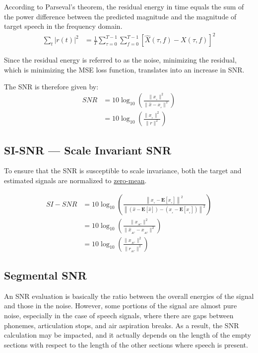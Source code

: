 According to Parseval's theorem, the residual energy in time equals the sum of
the power difference between the predicted magnitude 
and the magnitude of target speech 
in the frequency domain\cite{1643671009}.
\begin{align}
    \sum_{t} |r(t)|^{2} & = \frac{1}{T}\sum_{\tau=0}^{T-1}\sum_{f=0}^{T-1} \left[ \widehat{X}(\tau, f) - X(\tau, f)\right]^{2}
\end{align}

Since the residual energy is referred to as the noise,
minimizing the residual,
which is minimizing the MSE loss function,
translates into an increase in SNR.



The SNR is therefore given by:
\begin{align}\label{eq:snr_equation}
    SNR & = 10\log_{10} \left( \frac{ \| x_{_{s}}\|^{2}}{\|\widehat{x} - x_{_{s}} \|^{2}}  \right) \nonumber \\
    & =  10\log_{10} \left( \frac{ \| x_{_{s}} \|^{2}}{\| r \|^{2}} \right)
\end{align}
\subsection{SI-SNR --- Scale Invariant SNR}
To ensure that the SNR is susceptible to scale invariance\cite{roux2018sdr},
both the target and estimated signals are normalized to \underline{zero-mean}.

\begin{align}
    SI-SNR & = 10\log_{10} \left( \frac{\left\| x_{_{s}} - \mathbf{E}[x_{_{s}}]\right\|^{2}}
    {\left\| (\widehat{x} - \mathbf{E}[\widehat{x}]) - (x_{_{s}} - \mathbf{E}[x_{_{s}}]) \right\|^{2}} \right) \nonumber \\
    & = 10\log_{10} \left( \frac{ \| x_{_{AC}}\|^{2}}{\|\widehat{x}_{_{AC}} - x_{_{AC}}\|^{2}}  \right) \nonumber \\
    & =  10\log_{10} \left( \frac{ \| x_{_{AC}}\|^{2}}{\| r_{_{AC}} \|^{2}} \right)
\end{align}

\subsection{Segmental SNR}
An SNR evaluation is basically the ratio between the overall 
energies of the signal and those in the noise. 
However, some portions of the signal are almost pure noise, 
especially in the case of speech signals, 
where there are gaps between phonemes, 
articulation stops, and air aspiration breaks. As a result,
the SNR calculation may be impacted, and
it actually depends on
the length of the empty sections with respect 
to the length of
the other sections where speech is present.

